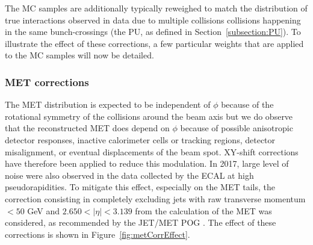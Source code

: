 \documentclass[a4paper, 10pt, openright]{report}
\begin{document}
The \ac{MC} samples are additionally typically reweighed to match the distribution of true interactions observed in data due to multiple collisions collisions happening in the same bunch-crossings (the \ac{PU}, as defined in Section~\ref{subsection:PU}). To illustrate the effect of these corrections, a few particular weights that are applied to the \ac{MC} samples will now be detailed. 

\subsubsection*{\ac{MET} corrections}

The \ac{MET} distribution is expected to be independent of $\phi$ because of the rotational symmetry of the collisions around the beam axis but we do observe that the reconstructed \ac{MET} does depend on $\phi$ because of possible anisotropic detector responses, inactive calorimeter cells or tracking regions, detector misalignment, or eventual displacements of the beam spot. XY-shift corrections have therefore been applied to reduce this modulation. In 2017, large level of noise were also observed in the data collected by the \ac{ECAL} at high pseudorapidities. To mitigate this effect, especially on the \ac{MET} tails, the correction consisting in completely excluding jets with raw transverse momentum $< 50$ GeV and $2.650 < |\eta| < 3.139$ from the calculation of the \ac{MET} was considered, as recommended by the JET/MET \ac{POG} \cite{EENoise}. The effect of these corrections is shown in Figure~\ref{fig:metCorrEffect}.
\end{document}
